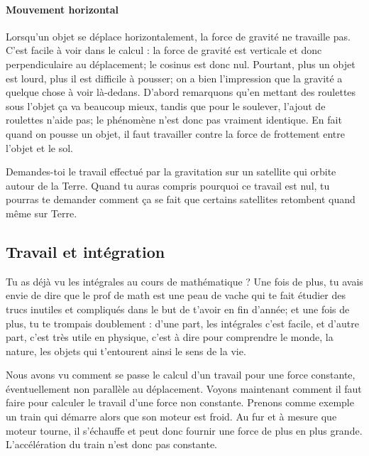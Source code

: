 \documentclass[a4paper,12pt]{book}
\theoremstyle{mes_exemples}	\newtheorem{exemple}[numtho]{Exemple}
\theoremstyle{mes_tho}
\begin{document}
\paragraph{Mouvement horizontal}

Lorsqu'un objet se déplace horizontalement, la force de gravité ne travaille pas. C'est facile à voir dans le calcul : la force de gravité est verticale et donc perpendiculaire au déplacement; le cosinus est donc nul. Pourtant, plus un objet est lourd, plus il est difficile à pousser; on a bien l'impression que la gravité a quelque chose à voir là-dedans. D'abord remarquons qu'en mettant des roulettes sous l'objet ça va beaucoup mieux, tandis que pour le soulever, l'ajout de roulettes n'aide pas; le phénomène n'est donc pas vraiment identique. En fait quand on pousse un objet, il faut travailler contre la force de frottement entre l'objet et le sol.

\begin{exercice}
Demandes-toi le travail effectué par la gravitation sur un satellite qui orbite autour de la Terre. Quand tu auras compris pourquoi ce travail est nul, tu pourras te demander comment ça se fait que certains satellites retombent quand même sur Terre.
\end{exercice}


\subsection{Travail et intégration}

Tu as déjà vu les intégrales au cours de mathématique ? Une fois de plus, tu avais envie de dire que le prof de math est une peau de vache qui te fait étudier des trucs inutiles et compliqués dans le but de t'avoir en fin d'année; et une fois de plus, tu te trompais doublement : d'une part, les intégrales c'est facile, et d'autre part, c'est très utile en physique, c'est à dire pour comprendre le monde, la nature, les objets qui t'entourent ainsi le sens de la vie.

Nous avons vu comment se passe le calcul d'un travail pour une force constante, éventuellement non parallèle au déplacement. Voyons maintenant comment il faut faire pour calculer le travail d'une force non constante. Prenons comme exemple un train qui démarre alors que son moteur est froid. Au fur et à mesure que moteur tourne, il s'échauffe et peut donc fournir une force de plus en plus grande. L'accélération du train n'est donc pas constante.
\end{document}
